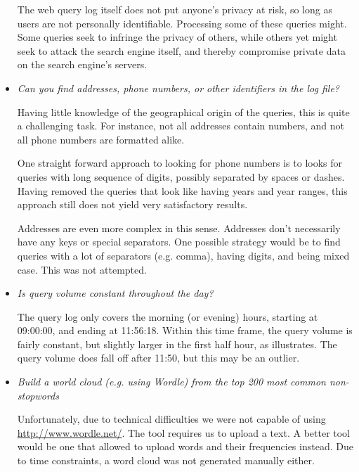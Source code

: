 \begin{itemize}
The web query log itself does not put anyone's privacy at risk, so long as
users are not personally identifiable. Processing some of these queries might.
Some queries seek to infringe the privacy of others, while others yet might
seek to attack the search engine itself, and thereby compromise private data on
the search engine's servers.

\item \emph{Can you find addresses, phone numbers, or other identifiers in the
log file?}

Having little knowledge of the geographical origin of the queries, this is
quite a challenging task. For instance, not all addresses contain numbers, and
not all phone numbers are formatted alike.

One straight forward approach to looking for phone numbers is to looks for
queries with long sequence of digits, possibly separated by spaces or dashes.
Having removed the queries that look like having years and year ranges, this
approach still does not yield very satisfactory results.

Addresses are even more complex in this sense. Addresses don't necessarily have
any keys or special separators. One possible strategy would be to find queries
with a lot of separators (e.g. comma), having digits, and being mixed case.
This was not attempted.

\item \emph{Is query volume constant throughout the day?}

The query log only covers the morning (or evening) hours, starting at 09:00:00,
and ending at 11:56:18. Within this time frame, the query volume is fairly
constant, but slightly larger in the first half hour, as 
illustrates. The query volume does fall off after 11:50\footnotemark, but this
may be an outlier.



\item \emph{Build a world cloud (e.g. using Wordle) from the top 200 most
common non-stopwords}

Unfortunately, due to technical difficulties we were not capable of using
\url{http://www.wordle.net/}. The tool requires us to upload a text. A better
tool would be one that allowed to upload words and their frequencies instead.
Due to time constraints, a word cloud was not generated manually either.

\end{itemize}

